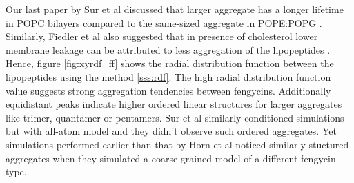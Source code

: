 Our last paper by Sur et al discussed that larger aggregate has a 
longer lifetime in POPC bilayers compared to the 
same-sized aggregate in POPE:POPG \cite{Grossfield2018}. Similarly, 
Fiedler et al also suggested that in presence 
of cholesterol lower membrane leakage can be attributed to less aggregation 
of the lipopeptides \cite{Heerklotz2015}.
Hence, figure  \ref{fig:xyrdf_ff} shows the radial distribution function between the 
lipopeptides using the method \ref{sss:rdf}. 
The high radial distribution function value suggests strong aggregation 
tendencies between fengycins. Additionally equidistant peaks indicate higher ordered 
linear structures for larger aggregates like trimer, quantamer or pentamers. 
Sur et al similarly conditioned simulations but with all-atom model and they didn't 
observe such ordered aggregates. \cite{Grossfield2018}
Yet simulations performed earlier than that by Horn et al noticed similarly stuctured 
aggregates when they simulated 
a coarse-grained model of a different fengycin type.
